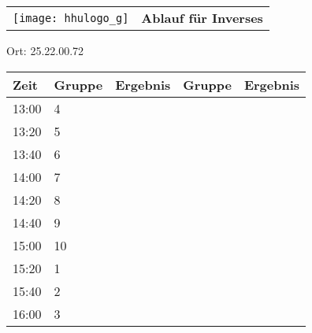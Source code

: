 \documentclass[a4paper,10pt]{article}
\def\spield{Inverses}
\def\raumd{25.22.00.72}
\begin{document}
  \begin{tabularx}{\textwidth}{lc}
    \texttt{[image: hhulogo\_g]}
  & {\Huge \textbf{Ablauf für \spield}}
  \end{tabularx}
  \LARGE
  \begin{center}
    \vspace{1cm} 
    Ort: \raumd
  \end{center}
    \vspace{2cm} 
    \begin{tabularx}{\textwidth}{X||X|X||X|X}
	\textbf{Zeit} &\textbf{Gruppe} & \textbf{Ergebnis} &\textbf{Gruppe} & \textbf{Ergebnis}  	\\ \hline \hline
	13:00 &	4	&	&	&	\\ \hline
	13:20 &	5	&	&	&	\\ \hline
	13:40 &	6	&	&	&	\\ \hline

	14:00 &	7	&	&	&	\\ \hline
	14:20 &	8	&	&	&	\\ \hline
	14:40 &	9	&	&	&	\\ \hline

	15:00 &	10	&	&	&	\\ \hline
	15:20 &	1	&	&	&	\\ \hline
	15:40 &	2	&	&	&	\\ \hline

	16:00 &	3	&	&	&	\\ \hline
      
    \end{tabularx}
   
   \newpage
\end{document}
